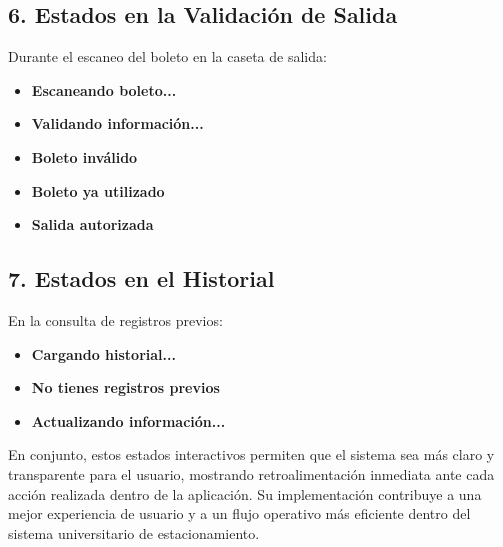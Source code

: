 \documentclass[12pt]{article}
\begin{document}
\subsection{6. Estados en la Validación de Salida}

Durante el escaneo del boleto en la caseta de salida:

\begin{itemize}
    \item \textbf{Escaneando boleto...}
    \item \textbf{Validando información...}
    \item \textbf{Boleto inválido}
    \item \textbf{Boleto ya utilizado}
    \item \textbf{Salida autorizada}
\end{itemize}

\subsection{7. Estados en el Historial}

En la consulta de registros previos:

\begin{itemize}
    \item \textbf{Cargando historial...}
    \item \textbf{No tienes registros previos}
    \item \textbf{Actualizando información...}
\end{itemize}

\bigskip

En conjunto, estos estados interactivos permiten que el sistema sea más claro y transparente para el usuario, mostrando retroalimentación inmediata ante cada acción realizada dentro de la aplicación. Su implementación contribuye a una mejor experiencia de usuario y a un flujo operativo más eficiente dentro del sistema universitario de estacionamiento.
\end{document}
